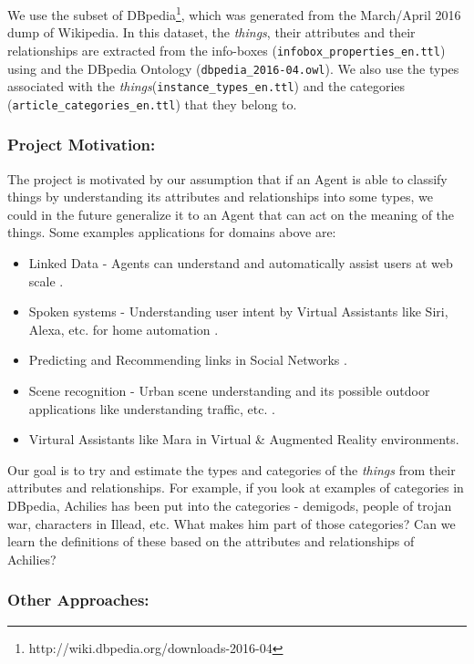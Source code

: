 \documentclass[runningheads,a4paper]{llncs}
\begin{document}
We use the subset of DBpedia\footnote{http://wiki.dbpedia.org/downloads-2016-04}, which was generated from the March/April 2016 dump of Wikipedia. In this dataset, the \textit{things}, their attributes and 
their relationships are extracted from the info-boxes (\texttt{infobox\_properties\_en.ttl}) using and the DBpedia Ontology (\texttt{dbpedia\_2016-04.owl}). We also use the types associated with the \textit{things}(\texttt{instance\_types\_en.ttl}) and the categories (\texttt{article\_categories\_en.ttl}) that they belong to.

\subsubsection{Project Motivation:}
The project is motivated by 
our assumption that if an Agent is able to classify things by understanding
its attributes and relationships into some types, we could in the future 
generalize it to an Agent that can act on the meaning of the things. 
Some examples applications for domains above are:
\begin{itemize}
\item Linked Data - Agents can understand and automatically assist users at web scale \cite{berners2001semantic}.
\item Spoken systems - Understanding user intent by Virtual Assistants like Siri, Alexa, etc. for home automation \cite{tang2017emergence}. 
\item Predicting and Recommending links in Social Networks \cite{backstrom2011supervised}.
\item Scene recognition - Urban scene understanding and its possible outdoor applications like understanding traffic, etc. \cite{cordts2015cityscapes}.
\item Virtural Assistants like Mara \cite{schmeil2007mara} in Virtual \& Augmented Reality environments.
\end{itemize}

Our goal is to try and estimate the types and categories of the \textit{things} from their attributes and relationships. 
For example, if you look at examples of categories in DBpedia, Achilies has been
put into the categories - demigods, people of trojan war, characters in Illead, etc.
What makes him part of those categories? Can we learn the definitions of these
based on the attributes and relationships of Achilies? 

\subsubsection{Other Approaches:}
\end{document}
